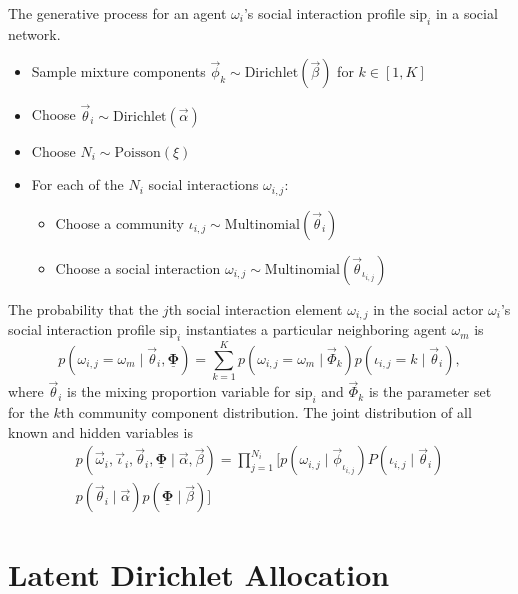\documentclass[letterpaper]{article}
\begin{document}
The generative process for an agent $ \omega_{i} $'s social interaction profile $ \mbox{sip}_{i} $ in a social network.
\begin{itemize}
	\item Sample mixture components $ \vec{\phi}_{k} \sim \mbox{Dirichlet}(\vec{\beta}) $ for $ k \in [1, K] $
	\item Choose $ \vec{\theta}_{i} \sim \mbox{Dirichlet}(\vec{\alpha}) $ 
	\item Choose $ N_{i}  \sim \mbox{Poisson}(\xi) $
	\item For each of the $ N_{i} $ social interactions $ \omega_{i,j} $:
	\begin{itemize}
		\item Choose a community $ \iota_{i,j} \sim \mbox{Multinomial}( \vec{\theta}_{i} ) $
		\item Choose a social interaction $ \omega_{i,j} \sim \mbox{Multinomial}( \vec{\theta}_{\iota_{i,j}} ) $	
	\end{itemize}
\end{itemize}

The probability that the $ j $th social interaction element $ \omega_{i,j} $ in the social actor $ \omega_{i} $'s social interaction profile $ \mbox{sip}_{i} $ instantiates a particular neighboring agent $ \omega_{m} $ is
\begin{equation}
p( \omega_{i,j} = \omega_{m} \mid \vec{\theta}_{i} , \underline{\mathbf{\Phi}} ) = \sum_{k=1}^{K} p( \omega_{i,j} = \omega_{m} \mid \vec{\Phi}_{k} ) p( \iota_{i,j} = k \mid \vec{\theta}_{i} ),
\end{equation}
where $ \vec{\theta}_{i} $ is the mixing proportion variable for $ \mbox{sip}_{i} $ and $ \vec{\Phi}_{k} $ is the parameter set for the $ k $th community component distribution.
The joint distribution of all known and hidden variables is
\begin{equation}
\begin{aligned}
p( \vec{\omega}_{i} , \vec{\iota}_{i}, \vec{\theta}_{i} , \underline{\mathbf{\Phi}}  \mid \vec{\alpha} , \vec{\beta} ) = \prod_{j=1}^{N_{i}} 
[ 
p( \omega_{i,j} \mid \vec{\phi}_{\iota_{i,j}} ) P( \iota_{i,j} \mid \vec{\theta}_{i} ) \\
p( \vec{\theta}_{i} \mid \vec{\alpha} ) p( \underline{\mathbf{\Phi}} \mid \vec{\beta} )
]
\end{aligned}
\end{equation}

\section{Latent Dirichlet Allocation}
\end{document}
